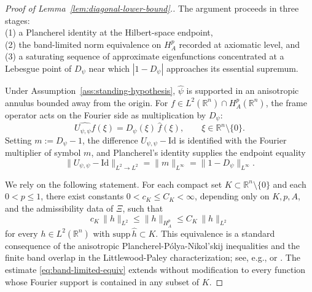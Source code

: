 \documentclass[pdflatex,sn-basic,Numbered]{sn-jnl}
\theoremstyle{thmstyleone}%
\theoremstyle{thmstylethree}%
\begin{document}
\begin{proof}[Proof of Lemma~\ref{lem:diagonal-lower-bound}.]
	The argument proceeds in three stages:\\
	(1) a Plancherel identity at the
	Hilbert-space endpoint,\\
	(2) the band-limited norm equivalence on $H^p_A$ recorded
	at axiomatic level, and\\
	(3) a saturating sequence of approximate eigenfunctions
	concentrated at a Lebesgue point of $D_\psi$ near which $|1 - D_\psi|$
	approaches its essential supremum.
	
	Under Assumption~\ref{ass:standing-hypothesis}, $\hat\psi$ is supported in an
	anisotropic annulus bounded away from the origin. For
	$f \in L^2(\mathbb{R}^n) \cap H^p_A(\mathbb{R}^n)$, the frame operator acts on
	the Fourier side as multiplication by $D_\psi$:
	\begin{equation*}\label{eq:multiplier-action}
		\widehat{U_{\psi,\psi} f}(\xi)
		 =  D_\psi(\xi)\, \hat f(\xi),
		\qquad \xi \in \mathbb{R}^n \setminus \{0\}.
	\end{equation*}
	Setting $m :=D_\psi - 1$, the difference $U_{\psi,\psi} - \mathrm{Id}$ is
	identified with the Fourier multiplier of symbol $m$, and Plancherel's
	identity supplies the endpoint equality
	\begin{equation*}\label{eq:l2-multiplier-norm}
		\| U_{\psi,\psi}- \mathrm{Id} \|_{L^2 \to L^2}
		=\| m \|_{L^\infty}
		=\| 1 - D_\psi \|_{L^\infty}.
	\end{equation*}
	
	We rely on the following statement. For each compact set $K \subset \mathbb{R}^n \setminus \{0\}$ and each $0 < p \le 1$,
	there exist constants $0 < c_K \le C_K < \infty$, depending only on
	$K, p, A$, and the admissibility data of $\Xi$, such that
	\begin{equation}\label{eq:band-limited-equiv}
		c_K \, \|h\|_{L^2}
		 \le  \|h\|_{H^p_A}
		 \le  C_K \, \|h\|_{L^2}
	\end{equation}
	for every $h \in L^2(\mathbb{R}^n)$ with $\mathrm{supp}\,\hat h \subset K$. This equivalence is a standard consequence of the anisotropic Plancherel-P\'olya-Nikol'skij inequalities and the finite band overlap in the Littlewood-Paley characterization; see, e.g., \cite[Section 1.4]{Triebel1983} or \cite[Section 3]{Bownik2007}.
	The estimate \eqref{eq:band-limited-equiv}
	extends without modification to every function whose Fourier support is
	contained in any subset of $K$.
	

\end{proof}
\end{document}
